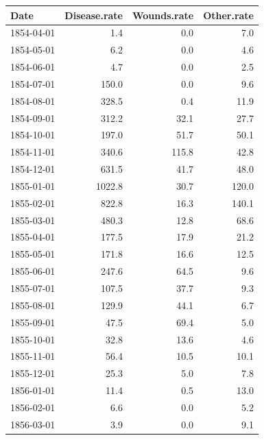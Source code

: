 \documentclass[
]{article}
\newenvironment{Shaded}{\begin{snugshade}}{\end{snugshade}}
\newcommand{\DataTypeTok}[1]{\textcolor[rgb]{0.13,0.29,0.53}{#1}}
\newcommand{\DecValTok}[1]{\textcolor[rgb]{0.00,0.00,0.81}{#1}}
\newcommand{\KeywordTok}[1]{\textcolor[rgb]{0.13,0.29,0.53}{\textbf{#1}}}
\newcommand{\NormalTok}[1]{#1}
\newcommand{\OperatorTok}[1]{\textcolor[rgb]{0.81,0.36,0.00}{\textbf{#1}}}
\newcommand{\OtherTok}[1]{\textcolor[rgb]{0.56,0.35,0.01}{#1}}
\newcommand{\StringTok}[1]{\textcolor[rgb]{0.31,0.60,0.02}{#1}}
\begin{document}
\begin{Shaded}
\end{Shaded}

\begin{longtable}[]{@{}lrrr@{}}
\toprule
Date & Disease.rate & Wounds.rate & Other.rate\tabularnewline
\midrule
\endhead
1854-04-01 & 1.4 & 0.0 & 7.0\tabularnewline
1854-05-01 & 6.2 & 0.0 & 4.6\tabularnewline
1854-06-01 & 4.7 & 0.0 & 2.5\tabularnewline
1854-07-01 & 150.0 & 0.0 & 9.6\tabularnewline
1854-08-01 & 328.5 & 0.4 & 11.9\tabularnewline
1854-09-01 & 312.2 & 32.1 & 27.7\tabularnewline
1854-10-01 & 197.0 & 51.7 & 50.1\tabularnewline
1854-11-01 & 340.6 & 115.8 & 42.8\tabularnewline
1854-12-01 & 631.5 & 41.7 & 48.0\tabularnewline
1855-01-01 & 1022.8 & 30.7 & 120.0\tabularnewline
1855-02-01 & 822.8 & 16.3 & 140.1\tabularnewline
1855-03-01 & 480.3 & 12.8 & 68.6\tabularnewline
1855-04-01 & 177.5 & 17.9 & 21.2\tabularnewline
1855-05-01 & 171.8 & 16.6 & 12.5\tabularnewline
1855-06-01 & 247.6 & 64.5 & 9.6\tabularnewline
1855-07-01 & 107.5 & 37.7 & 9.3\tabularnewline
1855-08-01 & 129.9 & 44.1 & 6.7\tabularnewline
1855-09-01 & 47.5 & 69.4 & 5.0\tabularnewline
1855-10-01 & 32.8 & 13.6 & 4.6\tabularnewline
1855-11-01 & 56.4 & 10.5 & 10.1\tabularnewline
1855-12-01 & 25.3 & 5.0 & 7.8\tabularnewline
1856-01-01 & 11.4 & 0.5 & 13.0\tabularnewline
1856-02-01 & 6.6 & 0.0 & 5.2\tabularnewline
1856-03-01 & 3.9 & 0.0 & 9.1\tabularnewline
\bottomrule
\end{longtable}

\begin{Shaded}
\end{Shaded}
\end{document}
